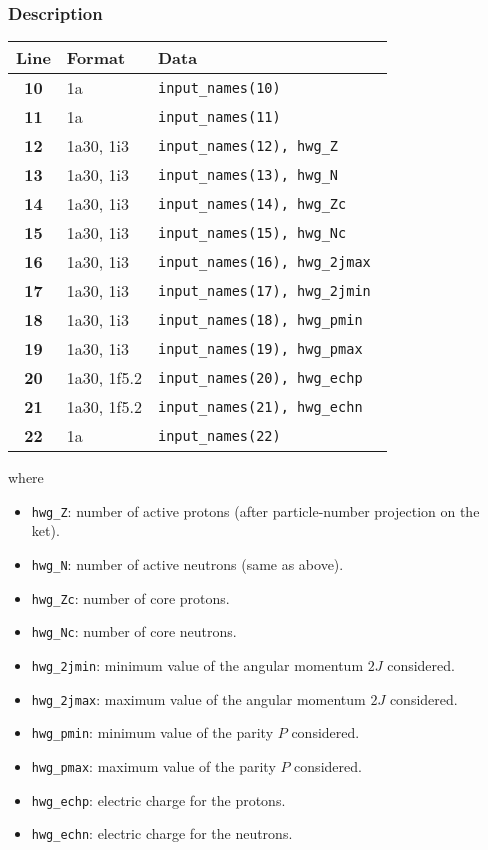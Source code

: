 \documentclass[a4paper,11pt]{article}
\newcommand{\ttt}[1]{\texttt{#1}}
\begin{document}
\subsubsection*{Description}
\begin{center}
\begin{tabular}{|c|l|l|}
\hline
Line & Format & Data \\
\hline
 \textbf{10}   & 1a           & \tt input\_names(10)              \\
 \textbf{11}   & 1a           & \tt input\_names(11)              \\
 \textbf{12}   & 1a30, 1i3    & \tt input\_names(12), hwg\_Z      \\
 \textbf{13}   & 1a30, 1i3    & \tt input\_names(13), hwg\_N      \\
 \textbf{14}   & 1a30, 1i3    & \tt input\_names(14), hwg\_Zc     \\
 \textbf{15}   & 1a30, 1i3    & \tt input\_names(15), hwg\_Nc     \\
 \textbf{16}   & 1a30, 1i3    & \tt input\_names(16), hwg\_2jmax  \\
 \textbf{17}   & 1a30, 1i3    & \tt input\_names(17), hwg\_2jmin  \\
 \textbf{18}   & 1a30, 1i3    & \tt input\_names(18), hwg\_pmin   \\
 \textbf{19}   & 1a30, 1i3    & \tt input\_names(19), hwg\_pmax   \\
 \textbf{20}   & 1a30, 1f5.2  & \tt input\_names(20), hwg\_echp   \\
 \textbf{21}   & 1a30, 1f5.2  & \tt input\_names(21), hwg\_echn   \\
 \textbf{22}   & 1a           & \tt input\_names(22)              \\
\hline
\end{tabular}
\end{center}
where
\begin{itemize}
 \item \ttt{hwg\_Z}: number of active protons (after particle-number projection on the ket).
 \item \ttt{hwg\_N}: number of active neutrons (same as above). 
 \item \ttt{hwg\_Zc}: number of core protons.
 \item \ttt{hwg\_Nc}: number of core neutrons. 
 \item \ttt{hwg\_2jmin}: minimum value of the angular momentum $2J$ considered.
 \item \ttt{hwg\_2jmax}: maximum value of the angular momentum $2J$ considered.
 \item \ttt{hwg\_pmin}: minimum value of the parity $P$ considered.
 \item \ttt{hwg\_pmax}: maximum value of the parity $P$ considered.
 \item \ttt{hwg\_echp}: electric charge for the protons.              
 \item \ttt{hwg\_echn}: electric charge for the neutrons.             
\end{itemize}
\end{document}
